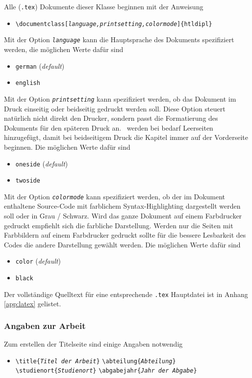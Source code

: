 Alle (\verb!.tex!) Dokumente dieser Klasse beginnen mit der Anweisung
%
\begin{itemize}
\item[] \verb!\documentclass[!\texttt{\emph{language,printsetting,colormode}}\verb!]{htldipl}! 
\end{itemize}
%
Mit der Option \texttt{\emph{language}} kann die Hauptsprache des Dokuments spezifiziert werden, 
die möglichen Werte dafür sind
%
\begin{itemize}
\item[] \verb!german! (\emph{default})
\item[] \verb!english!
\end{itemize}

Mit der Option \texttt{\emph{printsetting}} kann spezifiziert werden, ob das Dokument im Druck einseitig oder beidseitig gedruckt werden soll. Diese Option steuert natürlich nicht direkt den Drucker, sondern passt die Formatierung des Dokuments für den späteren Druck an. \ZB\ werden bei bedarf Leerseiten hinzugefügt, damit bei beidseitigem Druck die Kapitel immer auf der Vorderseite beginnen.
Die möglichen Werte dafür sind
%
\begin{itemize}
\item[] \verb!oneside! (\emph{default})
\item[] \verb!twoside!
\end{itemize}
%
Mit der Option \texttt{\emph{colormode}} kann spezifiziert werden, ob der im Dokument enthaltene Source-Code mit farblichem Syntax-Highlighting dargestellt werden soll oder in Grau / Schwarz. Wird das ganze Dokument auf einem Farbdrucker gedruckt empfiehlt sich die farbliche Darstellung. Werden nur die Seiten mit Farbbildern auf einem Farbdrucker gedruckt sollte für die bessere Lesbarkeit des Codes die andere Darstellung gewählt werden.
Die möglichen Werte dafür sind
%
\begin{itemize}
\item[] \verb!color! (\emph{default})
\item[] \verb!black!
\end{itemize}
%
Der vollständige Quelltext für eine entsprechende \verb!.tex! Hauptdatei ist in Anhang \ref{app:latex} 
gelistet.


\subsubsection{Angaben zur Arbeit}

Zum erstellen der Titelseite sind einige Angaben notwendig \zB\:
%
\begin{itemize}
\item[] %
\verb!\title{!\texttt{\em Titel der Arbeit}\verb!}! \newline%
\verb!\abteilung{!\texttt{\em Abteilung}\verb!}! \newline%
\verb!\studienort{!\texttt{\em Studienort}\verb!}! \newline%
\verb!\abgabejahr{!\texttt{\em Jahr der Abgabe}\verb!}!
\end{itemize}
%

